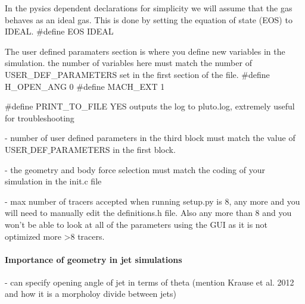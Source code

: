 \documentclass[12pt]{article}
\begin{document}
In the pysics dependent declarations for simplicity we will assume that the gas behaves as an ideal gas. This is done by setting the equation of state (EOS) to IDEAL.
\#define  EOS                     IDEAL

The user defined paramaters section is where you define new variables in the simulation. the number of variables here must match the number of USER\_DEF\_PARAMETERS set in the first section of the file.
\#define  H\_OPEN\_ANG              0
\#define  MACH\_EXT                1


\#define  PRINT\_TO\_FILE       YES
outputs the log to pluto.log, extremely useful for troubleshooting

- number of user defined parameters in the third block must match the value of USER$\_$DEF$\_$PARAMETERS in the first block.

- the geometry and body force selection must match the coding of your simulation in the init.c file

- max number of tracers accepted when running setup.py is 8, any more and you will need to manually edit the definitions.h file. Also any more than 8 and you won't be able to look at all of the parameters using the GUI as it is not optimized more >8 tracers.
\paragraph{Importance of geometry in jet simulations}\mbox{}
\newline
- can specify opening angle of jet in terms of theta (mention Krause et al. 2012 and how it is a morpholoy divide between jets)
\end{document}
